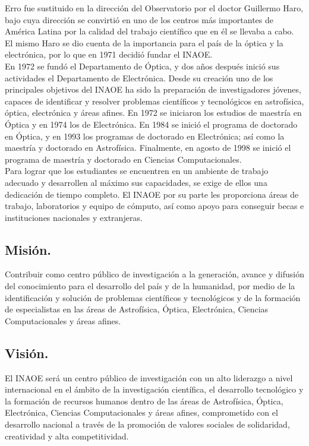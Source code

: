 Erro fue sustituido en la dirección del Observatorio por el doctor Guillermo Haro, bajo cuya dirección se convirtió en uno de los centros más importantes de América Latina por la calidad del trabajo científico que en él se llevaba a cabo. El mismo Haro se dio cuenta de la importancia para el país de la óptica y la electrónica, por lo que en 1971 decidió fundar el INAOE.
\\
 
En 1972 se fundó el Departamento de Óptica, y dos años después inició sus actividades el Departamento de Electrónica. Desde su creación uno de los principales objetivos del INAOE ha sido la preparación de investigadores jóvenes, capaces de identificar y resolver problemas científicos y tecnológicos en astrofísica, óptica, electrónica y áreas afines. En 1972 se iniciaron los estudios de maestría en Óptica y en 1974 los de Electrónica. En 1984 se inició el programa de doctorado en Óptica, y en 1993 los programas de doctorado en Electrónica; así como la maestría y doctorado en Astrofísica. Finalmente, en agosto de 1998 se inició el programa de maestría y doctorado en Ciencias Computacionales.
\\
  
Para lograr que los estudiantes se encuentren en un ambiente de trabajo adecuado y desarrollen al máximo sus capacidades, se exige de ellos una dedicación de tiempo completo. El INAOE por su parte les proporciona áreas de trabajo, laboratorios y equipo de cómputo, así como apoyo para conseguir becas e instituciones nacionales y extranjeras.

\subsection{Misión.}
Contribuir como centro público de investigación a la generación, avance y difusión del conocimiento para el desarrollo del país y de la humanidad, por medio de la identificación y solución de problemas científicos y tecnológicos y de la formación de especialistas en las áreas de Astrofísica, Óptica, Electrónica, Ciencias Computacionales y áreas afines.
 
\subsection{Visión.}
El INAOE será un centro público de investigación con un alto liderazgo a nivel internacional en el ámbito de la investigación científica, el desarrollo tecnológico y la formación de recursos humanos dentro de las áreas de Astrofísica, Óptica, Electrónica, Ciencias Computacionales y áreas afines, comprometido con el desarrollo nacional a través de la promoción de valores sociales de solidaridad, creatividad y alta competitividad.

